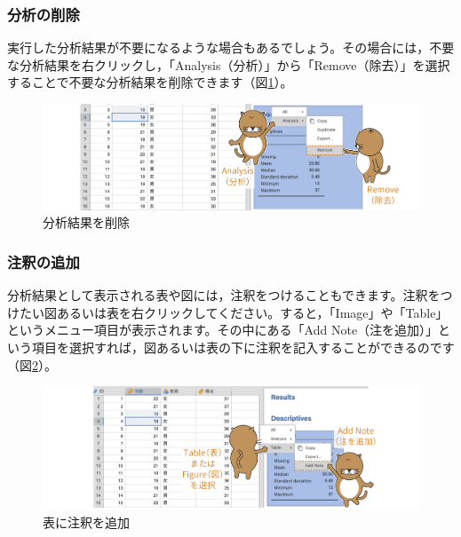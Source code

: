\documentclass[
  12pt,
  a5jpaper,
  lualatex, ja=standard]{bxjsbook}
\begin{document}
\hypertarget{ux5206ux6790ux306eux524aux9664}{%
\subsubsection*{分析の削除}\label{ux5206ux6790ux306eux524aux9664}}

実行した分析結果が不要になるような場合もあるでしょう。その場合には，不要な分析結果を右クリックし，「Analysis（分析）」から「Remove（除去）」を選択することで不要な分析結果を削除できます（図\ref{fig:bs2-remove-analysis}）。

\begin{figure}[!ht]

{\centering \includegraphics[width=1\linewidth]{images/basics2/remove-analysis} 

}

\caption{分析結果を削除}\label{fig:bs2-remove-analysis}
\end{figure}

\hypertarget{ux6ce8ux91c8ux306eux8ffdux52a0}{%
\subsubsection*{注釈の追加}\label{ux6ce8ux91c8ux306eux8ffdux52a0}}

分析結果として表示される表や図には，注釈をつけることもできます。注釈をつけたい図あるいは表を右クリックしてください。すると，「Image」や「Table」というメニュー項目が表示されます。その中にある「Add Note（注を追加）」という項目を選択すれば，図あるいは表の下に注釈を記入することができるのです（図\ref{fig:bs2-add-note}）。

\begin{figure}[!ht]

{\centering \includegraphics[width=1\linewidth]{images/basics2/add-note} 

}

\caption{表に注釈を追加}\label{fig:bs2-add-note}
\end{figure}
\end{document}
